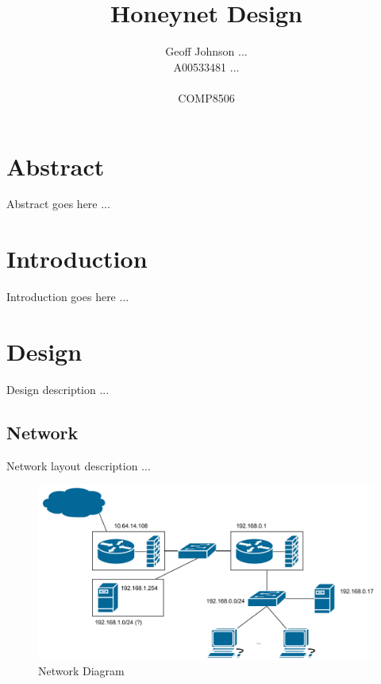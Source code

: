 \documentclass[11pt]{article}
\begin{document}
\nocite{*}

  \title{
    Honeynet Design
  }
  \author{
    Geoff Johnson ... \\
    A00533481 ... \\ \\
    COMP8506
  }
  \renewcommand{\today}{April xx, 2013}
  \maketitle
  \thispagestyle{empty}
  \newpage
  \mbox{}
  \thispagestyle{empty}

  \newpage
  \addtocounter{page}{-1}
  \tableofcontents
  \listoffigures
  \listoftables
  \lstlistoflistings

  \newpage

  \section{Abstract}
    \label{sec:abstract}

    Abstract goes here ...

  \section{Introduction}
    \label{sec:intro}

    Introduction goes here ...

  \newpage
  \section{Design}
    \label{sec:dsg}

    Design description ...

    \subsection{Network}
      \label{sec:dsg_net}

      Network layout description ...

      \begin{figure}[H]
        \centering
        \includegraphics[scale=.6]{figures/network-diagram.pdf}
        \caption{Network Diagram}
        \label{fig:dsg_net:diagram}
      \end{figure}
\end{document}
